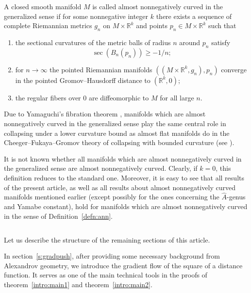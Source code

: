 \documentclass{amsart}
\begin{document}
\smallskip

 \begin{defn} \label{defn:ann}A closed smooth manifold $M$
is called almost nonnegatively curved in the generalized sense
if for some nonnegative integer $k$
there exists  a sequence of complete Riemannian metrics $g_n$ on
$M\times \mathbb{R}^k$
and points $p_n\in M\times \mathbb{R}^k$
such that
\begin{enumerate}
\item the sectional curvatures of the metric balls of radius $n$
around $p_n$ satisfy
$$\sec(B_n(p_n))\ge -1/n;$$
\item for $n\to\infty$
the pointed Riemannian manifolds $((M\times \mathbb{R}^k, g_n), p_n)$
converge in the pointed Gromov--Hausdorff distance to $(\mathbb{R}^k,0)$;
\item
the regular fibers over $0$
are diffeomorphic to $M$ for all large $n$.
\end{enumerate}
\end{defn}

Due to Yamaguchi's fibration theorem \cite{Yam},
manifolds which are almost nonnegatively curved in the generalized sense
play the same central role in collapsing under a lower curvature bound
as almost flat manifolds do
in the Cheeger--Fukaya--Gromov theory
of collapsing with bounded curvature  (see \cite{CFG}).

It is not known whether
all manifolds which are
almost nonnegatively curved %
in the generalized sense
are almost nonnegatively curved.
Clearly, if $k=0$, this definition reduces to the standard one.
Moreover, it is easy to see that all results of the present article,
as well as all results about
almost nonnegatively curved manifolds mentioned earlier
(except possibly for the ones concerning %
the $\hat A$-genus and Yamabe constant),
hold for manifolds which are almost nonnegatively curved
in the sense of
Definition~\ref{defn:ann}.


\smallskip


\subsection{}
Let us describe the structure of the remaining sections of this article.


In section~\ref{s:gradpush}, after providing some necessary background
from Alexandrov geometry,
we introduce the gradient flow of the square of a distance function.
It serves as one of
the main technical tools in the proofs of  theorem~\ref{intro:main1}
and  theorem~\ref{intro:main2}.
\end{document}
